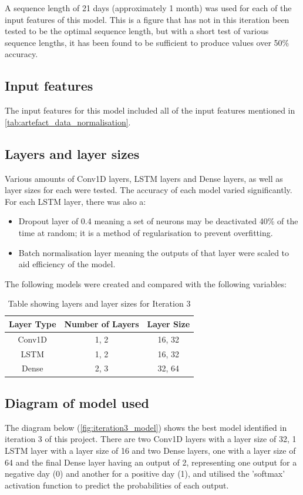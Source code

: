 A sequence length of 21 days (approximately 1 month) was used for each of the input features of this model.
This is a figure that has not in this iteration been tested to be the optimal sequence length, but with a short
test of various sequence lengths, it has been found to be sufficient to produce values over 50\% accuracy.

\subsection{Input features}
The input features for this model included all of the input features mentioned in \autoref{tab:artefact_data_normalisation}.

\subsection{Layers and layer sizes} \label{ssec:iteration3layers}
Various amounts of Conv1D layers, LSTM layers and Dense layers, as well as layer sizes for each were tested. The accuracy of each model varied
significantly. For each LSTM layer, there was also a:
\begin{itemize}
    \item Dropout layer of 0.4 meaning a set of neurons may be
    deactivated 40\% of the time at random; it is a method of regularisation to prevent overfitting.
    \item Batch normalisation layer meaning the outputs of that layer were scaled to aid efficiency of the model.
\end{itemize}

The following models were created and compared with the following variables:

\begin{table}[ht]
    \centering
    \begin{tabular}{|c|c|c|}
        \hline
        Layer Type & Number of Layers & Layer Size \\
        \hline\hline
        Conv1D & 1, 2 & 16, 32 \\
        LSTM & 1, 2 & 16, 32 \\
        Dense & 2, 3 & 32, 64 \\
        \hline
    \end{tabular}
    \caption{Table showing layers and layer sizes for Iteration 3}
    \label{tab:iteration3_layers}
\end{table}
\FloatBarrier

\subsection{Diagram of model used}
The diagram below (\autoref{fig:iteration3_model}) shows the best model identified in iteration 3 of this project.
There are two Conv1D layers with a layer size of 32, 1 LSTM layer with a layer size of 16 and two Dense layers, one
with a layer size of 64 and the final Dense layer having an output of 2, representing one output for
a negative day (0) and another for a positive day (1), and utilised the 'softmax' activation function to predict the
probabilities of each output.

